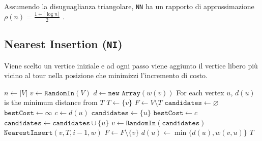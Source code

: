     

    
    

Assumendo la disuguaglianza triangolare, \texttt{NN} ha un rapporto di approssimazione
$\rho(n) = \frac{1+{\lceil\log{n}\rceil}}{2}$ \cite{STSP}.

\subsection{Nearest Insertion (\texttt{NI})}

Viene scelto un vertice iniziale e ad ogni passo
viene aggiunto il vertice libero più vicino al tour nella posizione che minimizzi l'incremento di costo.

\begin{algorithm}[H]
\caption{}
\begin{algorithmic}[1]
    \State $n \gets |V|$
    \State $v \gets \texttt{RandomIn}(V)$
    \State $d \gets \texttt{new Array}(w(v))$ \Comment For each vertex $u$, $d(u)$ is the minimum distance from $T$
    \State $T \gets \{v\}$
    \State $F \gets V \setminus T$
        \State $\texttt{candidates} \gets \varnothing$
        \State $\texttt{bestCost} \gets \infty$
            \State $c \gets d(u)$
                \State $\texttt{candidates} \gets \{u\}$
                \State $\texttt{bestCost} \gets c$
                \State $\texttt{candidates} \gets \texttt{candidates} \cup \{u\}$
            \EndIf
        \EndFor
        \State
        \State $v \gets \texttt{RandomIn}(\texttt{candidates})$
        \State $\texttt{NearestInsert}(v, T, i-1, w)$
        \State $F \gets F \setminus \{v\}$
        \State
            \State $d(u) \gets \min\{d(u), w(v,u)\}$
        \EndFor
    \EndFor
    \State
    \State \Return $T$
\EndFunction
\end{algorithmic}
\end{algorithm}

